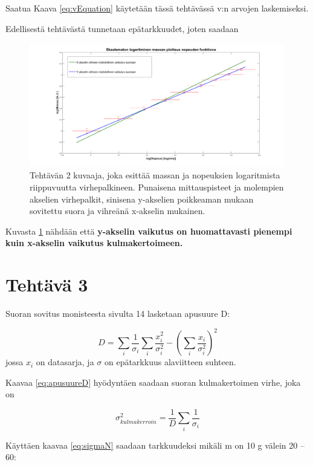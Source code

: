 \documentclass[a4paper, 12pt]{article}
\begin{document}
Saatua Kaava \ref{eq:vEquation} käytetään tässä tehtävässä v:n arvojen laskemiseksi.

Edellisestä tehtävästä tunnetaan epätarkkuudet, joten saadaan

\begin{figure}
\includegraphics[width=0.99\textwidth]{Laskari3_AOL/teht2_1652}
\caption{Tehtävän 2 kuvaaja, joka esittää massan ja nopeuksien logaritmista riippuvuutta virhepalkineen. Punaisena mittauspisteet ja molempien akselien virhepalkit, sinisena y-akselien poikkeaman mukaan sovitettu suora ja vihreänä x-akselin mukainen.}
\label{fig:teht2Im}
\end{figure}

Kuvasta \ref{fig:teht2Im} nähdään että \textbf{y-akselin vaikutus on huomattavasti pienempi kuin x-akselin vaikutus kulmakertoimeen.
}


\section*{Tehtävä 3}
Suoran sovitus monisteesta sivulta 14 lasketaan apusuure D:

\begin{equation}
D= \sum_i \frac{1}{\sigma_i} \sum_i \frac{x_i^2}{\sigma_i^2}- \left(\sum_i \frac{x_i}{\sigma_i^2} \right)^2
\label{eq:apusuureD}
\end{equation}
jossa $x_i$ on datasarja, ja $\sigma$ on epätarkkuus alaviitteen suhteen.


Kaavaa \ref{eq:apusuureD} hyödyntäen saadaan suoran kulmakertoimen virhe, joka on

\begin{equation}
\sigma_{kulmakerroin}^2 = \frac{1}{D} \sum_i \frac{1}{\sigma_i}
\label{eq:sigmaN}
\end{equation}

Käyttäen kaavaa \ref{eq:sigmaN} saadaan tarkkuudeksi mikäli m on 10 g välein 20 -- 60:
\end{document}
